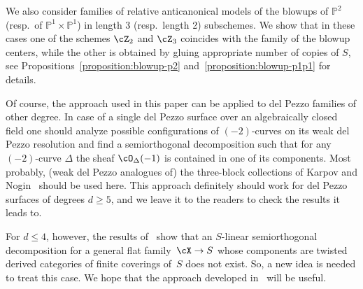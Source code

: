 \documentclass[11pt]{amsart}
\renewcommand{\P}{{\mathbb{P}}}
\theoremstyle{plain}
\theoremstyle{definition}
\theoremstyle{remark}
\begin{document}
We also consider families of relative anticanonical models of the blowups of $\P^2$ (resp.\ of $\P^1 \times \P^1$) in length 3 (resp.\ length 2) subschemes.
We show that in these cases one of the schemes $\cZ_2$ and $\cZ_3$ coincides with the family of the blowup centers, while the other is obtained by gluing appropriate number of copies of $S$,
see Propositions~\ref{proposition:blowup-p2} and~\ref{proposition:blowup-p1p1} for details.


Of course, the approach used in this paper can be applied to del Pezzo families of other degree.
In case of a single del Pezzo surface over an algebraically closed field one should analyze 
possible configurations of $(-2)$-curves on its weak del Pezzo resolution and find a semiorthogonal decomposition
such that for any $(-2)$-curve $\Delta$ the sheaf $\cO_\Delta(-1)$ is contained in one of its components.
Most probably, (weak del Pezzo analogues of) the three-block collections of Karpov and Nogin~\cite{karpov-nogin} should be used here.
This approach definitely should work for del Pezzo surfaces of degrees $d \ge 5$, and we leave it to the readers to check the results it leads to.

For $d \le 4$, however, the results of~\cite[Theorem~5.1]{auel2015semiorthogonal} show 
that an $S$-linear semiorthogonal decomposition for a general flat family~$\cX \to S$ 
whose components are twisted derived categories of finite coverings of~$S$ does not exist.
So, a new idea is needed to treat this case.
We hope that the approach developed in~\cite{KKS} will be useful.

% 
\end{document}
